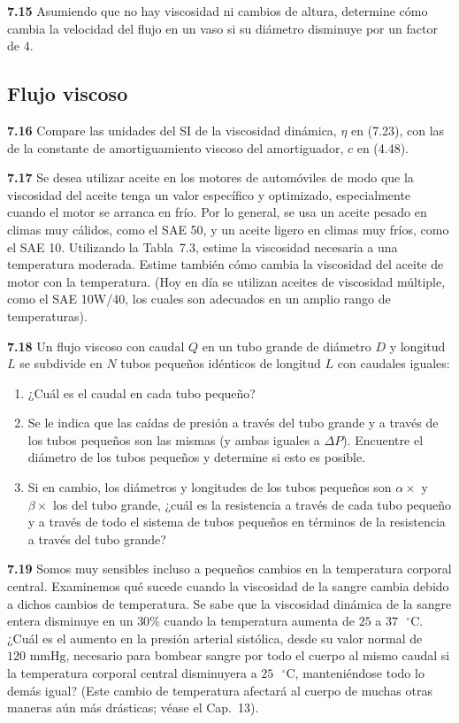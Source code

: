 \documentclass[12pt]{book}
\begin{document}
\textbf{7.15} Asumiendo que no hay viscosidad ni cambios de altura, determine cómo cambia la velocidad del flujo en un vaso si su diámetro disminuye por un factor de $4$.

\subsection*{Flujo viscoso}

\textbf{7.16} Compare las unidades del SI de la viscosidad dinámica, $\eta$ en (7.23), con las de la constante de amortiguamiento viscoso del amortiguador, $c$ en (4.48).

\textbf{7.17} Se desea utilizar aceite en los motores de automóviles de modo que la viscosidad del aceite tenga un valor específico y optimizado, especialmente cuando el motor se arranca en frío. Por lo general, se usa un aceite pesado en climas muy cálidos, como el SAE 50, y un aceite ligero en climas muy fríos, como el SAE 10. Utilizando la Tabla~7.3, estime la viscosidad necesaria a una temperatura moderada. Estime también cómo cambia la viscosidad del aceite de motor con la temperatura. (Hoy en día se utilizan aceites de viscosidad múltiple, como el SAE 10W/40, los cuales son adecuados en un amplio rango de temperaturas).

\textbf{7.18} Un flujo viscoso con caudal $Q$ en un tubo grande de diámetro $D$ y longitud $L$ se subdivide en $N$ tubos pequeños idénticos de longitud $L$ con caudales iguales:
\begin{enumerate}
  \item[(a)] ¿Cuál es el caudal en cada tubo pequeño?
  \item[(b)] Se le indica que las caídas de presión a través del tubo grande y a través de los tubos pequeños son las mismas (y ambas iguales a $\Delta P$). Encuentre el diámetro de los tubos pequeños y determine si esto es posible.
  \item[(c)] Si en cambio, los diámetros y longitudes de los tubos pequeños son $\alpha\times$ y $\beta\times$ los del tubo grande, ¿cuál es la resistencia a través de cada tubo pequeño y a través de todo el sistema de tubos pequeños en términos de la resistencia a través del tubo grande?
\end{enumerate}

\textbf{7.19} Somos muy sensibles incluso a pequeños cambios en la temperatura corporal central. Examinemos qué sucede cuando la viscosidad de la sangre cambia debido a dichos cambios de temperatura. Se sabe que la viscosidad dinámica de la sangre entera disminuye en un $30\%$ cuando la temperatura aumenta de $25$ a $37\text{ }^\circ\text{C}$. ¿Cuál es el aumento en la presión arterial sistólica, desde su valor normal de $120\text{ mmHg}$, necesario para bombear sangre por todo el cuerpo al mismo caudal si la temperatura corporal central disminuyera a $25\text{ }^\circ\text{C}$, manteniéndose todo lo demás igual? (Este cambio de temperatura afectará al cuerpo de muchas otras maneras aún más drásticas; véase el Cap.~13).
\end{document}

